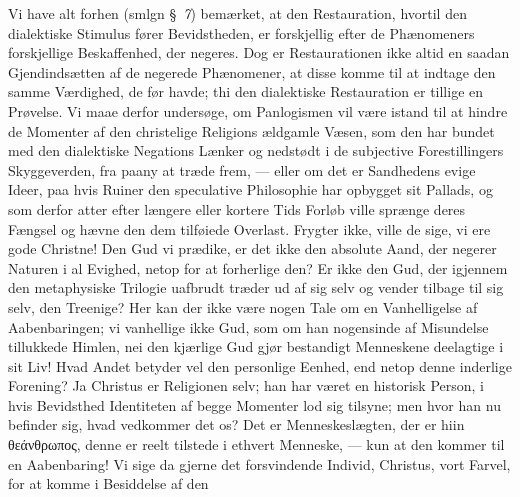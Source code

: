 \documentclass[12pt]{book}
\newcommand{\opage}[1]{\marginnote{\footnotesize\textit{[#1]}}}
\begin{document}
Vi have alt forhen (smlgn §~\textit{7}) bemærket, at den Restauration, hvortil
den dialektiske Stimulus fører Bevidstheden, er forskjellig efter de
Phænomeners forskjellige Beskaffenhed, der negeres. Dog er Restaurationen ikke
altid en saadan Gjendindsætten af de negerede Phænomener, at disse komme til at
indtage den samme Værdighed, de før havde; thi den dialektiske Restauration er
tillige en Prøvelse. Vi maae derfor undersøge, om Panlogismen vil være istand
til at hindre de Momenter af den christelige Religions ældgamle Væsen, som den
har bundet med den dialektiske Negations Lænker og nedstødt i de subjective
Forestillingers Skyggeverden, fra paany at træde frem, --- eller om det er
Sandhedens evige Ideer, paa hvis Ruiner den speculative Philosophie har opbygget
sit
\opage{137} \setcounter{footnote}{0}%
Pallads, og som derfor atter efter længere eller kortere Tids Forløb ville
sprænge deres Fængsel og hævne den dem tilføiede Overlast. Frygter ikke, ville
de sige, vi ere gode Christne! Den Gud vi prædike, er det ikke den absolute
Aand, der negerer Naturen i al Evighed, netop for at forherlige den? Er ikke den
Gud, der igjennem den metaphysiske Trilogie uafbrudt træder ud af sig selv og
vender tilbage til sig selv, den Treenige? Her kan der ikke være nogen Tale om
en Vanhelligelse af Aabenbaringen; vi vanhellige ikke Gud, som om han nogensinde
af Misundelse tillukkede Himlen, nei den kjærlige Gud gjør bestandigt
Menneskene deelagtige i sit Liv! Hvad Andet betyder vel den personlige Eenhed,
end netop denne inderlige Forening? Ja Christus er Religionen selv; han har
været en historisk Person, i hvis Bevidsthed Identiteten af begge Momenter lod
sig tilsyne; men hvor han nu befinder sig, hvad vedkommer det os? Det er
Menneskeslægten, der er hiin θεάνθρωπος, denne er reelt tilstede i ethvert
Menneske, --- kun at den kommer til en Aabenbaring! Vi sige da gjerne det
forsvindende Individ, Christus, vort Farvel, for at komme i Besiddelse af den
\end{document}

